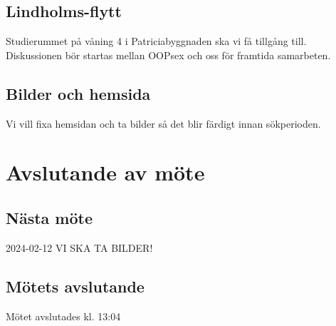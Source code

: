 \documentclass[protokoll]{dvd}
\begin{document}
\subsection*{Lindholms-flytt}
Studierummet på våning 4 i Patriciabyggnaden ska vi få tillgång till.
Diskussionen bör startas mellan OOPsex och oss för framtida samarbeten.

\subsection*{Bilder och hemsida}
Vi vill fixa hemsidan och ta bilder så det blir färdigt innan sökperioden.

\newpage
\section{Avslutande av möte}

\subsection{Nästa möte} 
2024-02-12 VI SKA TA BILDER!

\subsection{Mötets avslutande}
Mötet avslutades kl. 13:04

\styrelsesignaturer
\end{document}
